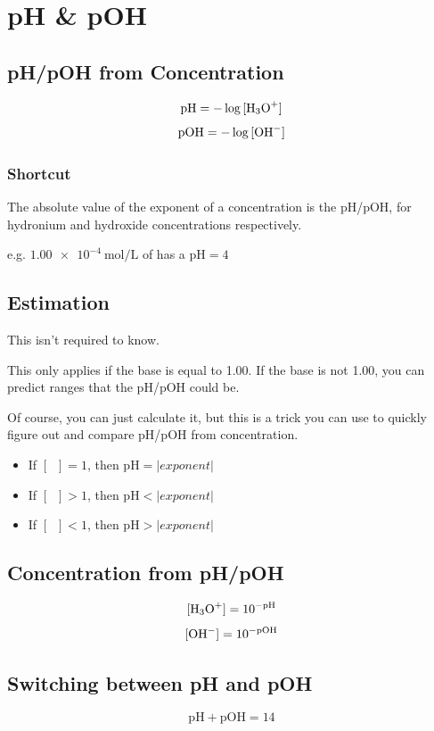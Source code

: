 \documentclass[a4paper,12pt]{article}
\begin{document}
\section{pH \& pOH}
\subsection{pH/pOH from Concentration}
\Large
$$\textrm{pH} = -\log{[\ce{H3O+}]}$$
$$\textrm{pOH} = -\log{[\ce{OH-}]}$$
\normalsize

\subsubsection{Shortcut}
The absolute value of the exponent of a concentration is the pH/pOH, for hydronium and hydroxide concentrations respectively.

e.g. $\SI{1.00e-4}{\mol\per\L}$ of  has a $\textrm{pH} = 4$

\subsection{Estimation}
This isn't required to know.

This only applies if the base is equal to 1.00. If the base is not 1.00, you can predict ranges that the pH/pOH could be. 

Of course, you can just calculate it, but this is a trick you can use to quickly figure out and compare pH/pOH from concentration.

\begin{itemize}
    \item{If $[\;\;] = 1$, then $\textrm{pH} = |exponent|$}
    \item{If $[\;\;] > 1$, then $\textrm{pH} < |exponent|$}
    \item{If $[\;\;] < 1$, then $\textrm{pH} > |exponent|$}
\end{itemize}


\subsection{Concentration from pH/pOH}
\Large
$$[\ce{H3O+}] = 10^{-\textrm{pH}}$$
$$[\ce{OH-}] = 10^{-\textrm{pOH}}$$
\normalsize

\subsection{Switching between pH and pOH}
\Large
$$\textrm{pH} + \textrm{pOH} = 14$$
\normalsize
\end{document}
